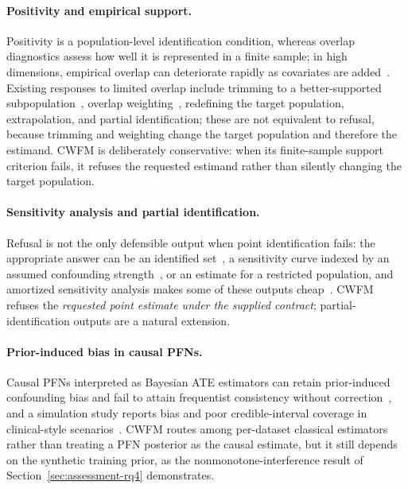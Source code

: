 \documentclass[electronics,article,submit,oneauthor]{Definitions/mdpi}
\begin{document}
\paragraph{Positivity and empirical support.} Positivity is a population-level identification condition, whereas overlap diagnostics assess how well it is represented in a finite sample; in high dimensions, empirical overlap can deteriorate rapidly as covariates are added~\cite{damour2021overlap}. Existing responses to limited overlap include trimming to a better-supported subpopulation~\cite{crump2009overlap}, overlap weighting~\cite{li2018overlap}, redefining the target population, extrapolation, and partial identification; these are not equivalent to refusal, because trimming and weighting change the target population and therefore the estimand. CWFM is deliberately conservative: when its finite-sample support criterion fails, it refuses the requested estimand rather than silently changing the target population.

\paragraph{Sensitivity analysis and partial identification.} Refusal is not the only defensible output when point identification fails: the appropriate answer can be an identified set~\cite{manski1990bounds}, a sensitivity curve indexed by an assumed confounding strength~\cite{rosenbaum1983sensitivity}, or an estimate for a restricted population, and amortized sensitivity analysis makes some of these outputs cheap~\cite{javurek2026sensitivitypfn}. CWFM refuses the \emph{requested point estimate under the supplied contract}; partial-identification outputs are a natural extension.

\paragraph{Prior-induced bias in causal PFNs.} Causal PFNs interpreted as Bayesian ATE estimators can retain prior-induced confounding bias and fail to attain frequentist consistency without correction~\cite{ospc2026correction}, and a simulation study reports bias and poor credible-interval coverage in clinical-style scenarios~\cite{mourao2026pfnsim}. CWFM routes among per-dataset classical estimators rather than treating a PFN posterior as the causal estimate, but it still depends on the synthetic training prior, as the nonmonotone-interference result of Section~\ref{sec:assessment-rq4} demonstrates.
\end{document}
